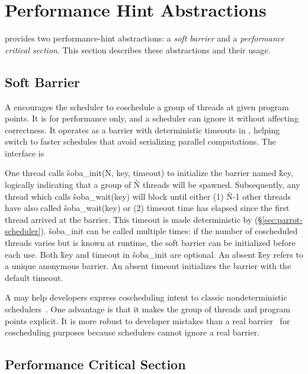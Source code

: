 \section{Performance Hint Abstractions} \label{sec:parrot-hints}

\parrot provides two performance-hint abstractions: a \emph{soft barrier} and
a \emph{performance critical section}.  This section describes these abstractions and
their usage.


\subsection{Soft Barrier} \label{sec:soft-barrier}

A \vcompute encourages the scheduler to coschedule a group of threads at
given program points.  It is for performance only, and a scheduler can
ignore it without affecting correctness.  It operates as a
barrier with deterministic timeouts in \parrot, helping \parrot switch to faster
schedules that avoid serializing parallel computations.  The interface is
\vspace{-3 mm}
\vspace{-1 mm}

\noindent
One thread calls \v{soba\_init(N, key, timeout)} to initialize the barrier
named \v{key}, logically indicating that a group of \v{N} threads will
be spawned.  Subsequently, any thread which calls \v{soba\_wait(key)}
will block until either (1) \v{N}-1 other threads have also called
\v{soba\_wait(key)} or (2) \v{timeout} time has elapsed since the first
thread arrived at the barrier.  This timeout is made deterministic by \parrot
(\S\ref{sec:parrot-scheduler}).  \v{soba\_init} can be called multiple
times: if the number of coscheduled threads varies but is known at runtime,
the soft barrier can be initialized before each use.  Both \v{key} and
\v{timeout} in \v{soba\_init} are optional.  An absent \v{key} refers to a
unique anonymous barrier.  An absent \v{timeout} initializes the barrier
with the default timeout.

A \compute may help developers express coscheduling intent to classic
nondeterministic schedulers~\cite{coschedule}.  One advantage is that it
makes the group of threads and program points explicit.  It is more robust
to developer mistakes than a real barrier~\cite{coschedule:sigmetrics96}
for coscheduling purposes because schedulers cannot ignore a real barrier.


\subsection{Performance Critical Section} \label{sec:parrot-performance-critical-section}


